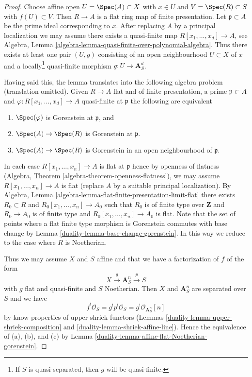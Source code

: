 \begin{proof}

Choose affine open $U = \Spec(A) \subset X$ with $x \in U$ and
$V = \Spec(R) \subset S$ with $f(U) \subset V$. Then $R \to A$
is a flat ring map of finite presentation. Let $\mathfrak p \subset A$
be the prime ideal corresponding to $x$. After replacing $A$ by a
principal localization we may assume there exists a quasi-finite map
$R[x_1, \ldots, x_d]  \to A$, see
Algebra, Lemma \ref{algebra-lemma-quasi-finite-over-polynomial-algebra}.
Thus there exists at least one pair $(U, g)$ consisting of an
open neighbourhood $U \subset X$ of $x$ and a locally\footnote{If $S$
is quasi-separated, then $g$ will be quasi-finite.} quasi-finite morphism
$g : U \to \mathbf{A}^d_S$.

\medskip\noindent
Having said this, the lemma translates into the following algebra
problem (translation omitted). Given $R \to A$ flat and of finite
presentation, a prime $\mathfrak p \subset A$ and
$\varphi : R[x_1, \ldots, x_d] \to A$ quasi-finite at $\mathfrak p$
the following are equivalent
\begin{enumerate}
\item[(a)] $\Spec(\varphi)$ is Gorenstein at $\mathfrak p$, and
\item[(b)] $\Spec(A) \to \Spec(R)$ is Gorenstein at $\mathfrak p$.
\item[(c)] $\Spec(A) \to \Spec(R)$ is Gorenstein in an open neighbourhood
of $\mathfrak p$.
\end{enumerate}
In each case $R[x_1, \ldots, x_n] \to A$ is flat at $\mathfrak p$
hence by openness of flatness
(Algebra, Theorem \ref{algebra-theorem-openness-flatness}),
we may assume $R[x_1, \ldots, x_n] \to A$
is flat (replace $A$ by a suitable principal localization).
By Algebra, Lemma \ref{algebra-lemma-flat-finite-presentation-limit-flat}
there exists $R_0 \subset R$ and $R_0[x_1, \ldots, x_n] \to A_0$
such that $R_0$ is of finite type over $\mathbf{Z}$ and
$R_0 \to A_0$ is of finite type and $R_0[x_1, \ldots, x_n] \to A_0$ is flat.
Note that the set of points where a flat finite type morphism
is Gorenstein commutes with base change by
Lemma \ref{duality-lemma-base-change-gorenstein}.
In this way we reduce to the case where $R$ is Noetherian.

\medskip\noindent
Thus we may assume $X$ and $S$ affine and that
we have a factorization of $f$ of the form
$$
X \xrightarrow{g} \mathbf{A}^n_S \xrightarrow{p} S
$$
with $g$ flat and quasi-finite and $S$ Noetherian. Then $X$ and
$\mathbf{A}^n_S$ are separated over $S$ and we have
$$
f^!\mathcal{O}_S = g^!p^!\mathcal{O}_S = g^!\mathcal{O}_{\mathbf{A}^n_S}[n]
$$
by know properties of upper shriek functors
(Lemmas \ref{duality-lemma-upper-shriek-composition} and
\ref{duality-lemma-shriek-affine-line}).
Hence the equivalence of (a), (b), and (c) by
Lemma \ref{duality-lemma-affine-flat-Noetherian-gorenstein}.
\end{proof}

